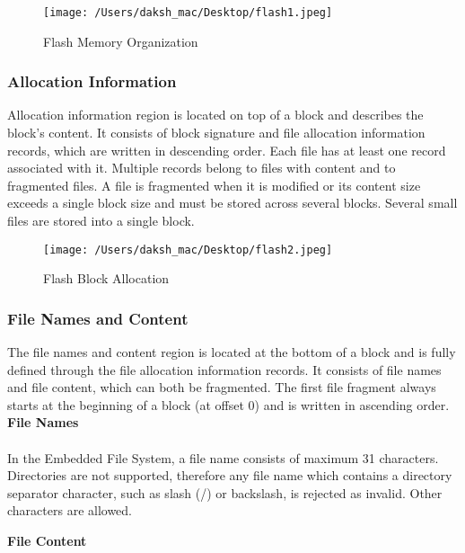\documentclass[12pt]{article}
\begin{document}
\begin{figure}[H]
	\centering
	\texttt{[image: /Users/daksh\_mac/Desktop/flash1.jpeg]}
	\caption[About file system]{Flash Memory Organization}
	\label{fig:flash}	
\end{figure}

\subsubsection{Allocation Information}

Allocation information region is located on top of a block and describes the block's content. It consists of block signature and file allocation information records, which are written in descending order. Each file has at least one record associated with it. Multiple records belong to files with content and to fragmented files. A file is fragmented when it is modified or its content size exceeds a single block size and must be stored across several blocks. Several small files are stored into a single block.

\begin{figure}[H]
	\centering
	\texttt{[image: /Users/daksh\_mac/Desktop/flash2.jpeg]}
	\caption[About file system]{Flash Block Allocation}
	\label{fig:flash2}	
\end{figure}

\subsubsection{File Names and Content}

The file names and content region is located at the bottom of a block and is fully defined through the file allocation information records. It consists of file names and file content, which can both be fragmented. The first file fragment always starts at the beginning of a block (at offset 0) and is written in ascending order.\\

\textbf{File Names}\\\\
In the Embedded File System, a file name consists of maximum 31 characters. Directories are not supported, therefore any file name which contains a directory separator character, such as slash (/) or backslash, is rejected as invalid. Other characters are allowed.
\cleardoublepage

\textbf{File Content}\\
\end{document}
